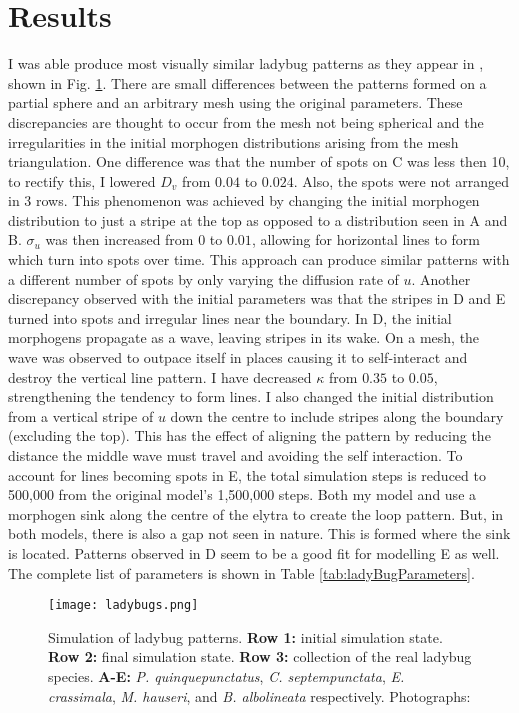 \section{Results}
I was able produce most visually similar ladybug patterns as they appear in \citep{Liaw2001}, shown in Fig. \ref{fig:ladyBugPatterns}. There are small differences between the patterns formed on a partial sphere and an arbitrary mesh using the original parameters. These discrepancies are thought to occur from the mesh not being spherical and the irregularities in the initial morphogen distributions arising from the mesh triangulation. One difference was that the number of spots on C was less then 10, to rectify this, I lowered $D_v$ from $0.04$ to $0.024$. Also, the spots were not arranged in 3 rows. This phenomenon was achieved by changing the initial morphogen distribution to just a stripe at the top as opposed to a distribution seen in A and B. $\sigma_u$ was then increased from $0$ to $0.01$, allowing for horizontal lines to form which turn into spots over time. This approach can produce similar patterns  with a different number of spots by only varying the diffusion rate of $u$. Another discrepancy observed with the initial parameters was that the stripes in D and E turned into spots and irregular lines near the boundary. In D, the initial morphogens propagate as a wave, leaving stripes in its wake. On a mesh, the wave was observed to outpace itself in places causing it to self-interact and destroy the vertical line pattern. I have decreased $\kappa$ from $0.35$ to $0.05$, strengthening the tendency to form lines. I also changed the initial distribution from a vertical stripe of $u$ down the centre to include stripes along the boundary (excluding the top). This has the effect of aligning the pattern by reducing the distance the middle wave must travel and avoiding the self interaction. To account for lines becoming spots in E, the total simulation steps is reduced to 500,000 from the original model's 1,500,000 steps. Both my model and \citep{Liaw2001} use a morphogen sink along the centre of the elytra to create the loop pattern. But, in both models, there is also a gap not seen in nature. This is formed where the sink is located. Patterns observed in D seem to be a good fit for modelling E as well. The complete list of parameters is shown in Table \ref{tab:ladyBugParameters}.

\begin{figure}[!ht]
	\centering
	\texttt{[image: ladybugs.png]}
	\caption{Simulation of ladybug patterns. \textbf{Row 1:} initial simulation state. \textbf{Row 2:} final simulation state. \textbf{Row 3:} collection of the real ladybug species. \textbf{A-E:} \textit{P. quinquepunctatus}, \textit{C. septempunctata}, \textit{E. crassimala}, \textit{M. hauseri}, and \textit{B. albolineata} respectively. \textcolor{citation-gray}{Photographs: \citep{Chen2008}}}
	\label{fig:ladyBugPatterns}
\end{figure}

